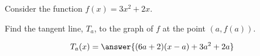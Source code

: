 \documentclass{ximera}
\author{Steven Gubkin}
\begin{document}
\begin{exercise}

Consider the function $f(x) = 3x^2 + 2x$.

Find the tangent line, $T_a$, to the graph of $f$ at the point $(a,f(a))$.

\begin{prompt}
	\[
	T_a(x) = \answer{(6a+2)(x-a)+3a^2+2a}
	\]
\end{prompt}




\end{exercise}
\end{document}
